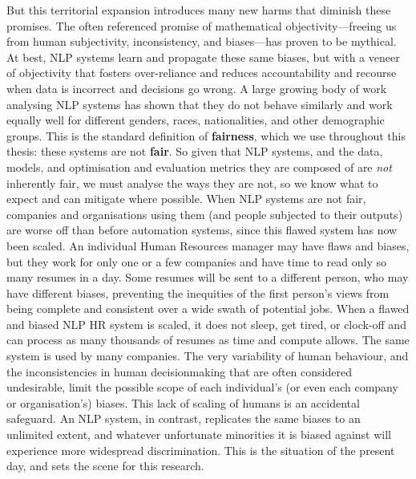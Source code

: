 But this territorial expansion introduces many new harms that diminish these promises.  
The often referenced promise of mathematical objectivity---freeing us from human subjectivity, inconsistency, and biases---has proven to be mythical. 
At best, NLP systems learn and propagate these same biases, but with a veneer of objectivity that fosters over-reliance \citep{oneil2016weapons} and reduces accountability and recourse when data is incorrect and decisions go wrong. 
A large growing body of work analysing NLP systems has shown that they do not behave similarly and work equally well for different genders, races, nationalities, and other demographic groups. This is the standard definition of \textbf{fairness}, which we use throughout this thesis: these systems are not \textbf{fair}. 
So given that NLP systems, and the data, models, and optimisation and evaluation metrics they are composed of are \textit{not} inherently fair, we must analyse the ways they are not, so we know what to expect and can mitigate where possible. When NLP systems are not fair, companies and organisations using them (and people subjected to their outputs) are worse off than before automation systems, since this flawed system has now been scaled. An individual Human Resources manager may have flaws and biases, but they work for only one or a few companies and have time to read only so many resumes in a day. Some resumes will be sent to a different person, who may have different biases, preventing the inequities of the first person's views from being complete and consistent over a wide swath of potential jobs. When a flawed and biased NLP HR system is scaled, it does not sleep, get tired, or clock-off and can process as many thousands of resumes as time and compute allows. The same system is used by many companies. The very variability of human behaviour, and the inconsistencies in human decisionmaking that are often considered undesirable, limit the possible scope of each individual's (or even each company or organisation's) biases. This lack of scaling of humans is an accidental safeguard. An NLP system, in contrast, replicates the same biases to an unlimited extent, and whatever unfortunate minorities it is biased against will experience more widespread discrimination. This is the situation of the present day, and sets the scene for this research.

